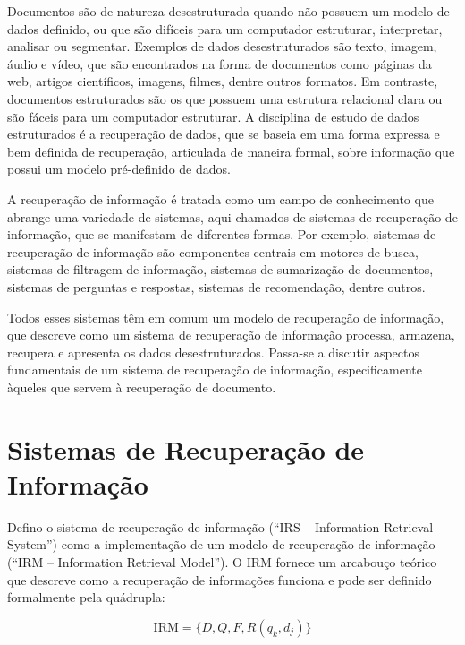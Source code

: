 \documentclass[
	12pt,				%
	openright,			%
	oneside,			%
	a4paper,			%
	english,			%
	french,				%
	spanish,			%
	brazil				%
	]{abntex2}
\begin{document}
Documentos são de natureza desestruturada quando não possuem um modelo de dados definido, ou que são difíceis para um computador
estruturar, interpretar, analisar ou segmentar. \cite{manning2008introduction}
Exemplos de dados desestruturados são texto, imagem, áudio e vídeo, que são encontrados na forma de
documentos como páginas da web, artigos científicos, imagens, filmes, dentre outros formatos.
Em contraste, documentos estruturados são os que possuem uma estrutura relacional clara ou são fáceis para um computador estruturar.
A disciplina de estudo de dados estruturados é a recuperação de dados, que se baseia em uma forma expressa e bem
definida de recuperação, articulada de maneira formal, sobre informação que possui um modelo pré-definido de dados. \cite{JurafskyMartin2023}

A recuperação de informação é tratada como um campo de conhecimento que abrange uma variedade de
sistemas, aqui chamados de sistemas de recuperação de informação, que se manifestam de diferentes formas.
Por exemplo, sistemas de recuperação de informação são componentes centrais em motores de busca,
sistemas de filtragem de informação, sistemas de sumarização de documentos, sistemas de perguntas e respostas,
sistemas de recomendação, dentre outros. \cite{Ceri2013}

Todos esses sistemas têm em comum um modelo de recuperação de informação, que descreve como um sistema de recuperação de informação
processa, armazena, recupera e apresenta os dados desestruturados.
Passa-se a discutir aspectos fundamentais de um sistema de recuperação de informação, especificamente àqueles que
servem à recuperação de documento.

\section{Sistemas de Recuperação de Informação}\label{sec:sistemas-de-recuperacao-de-informacao}

Defino o sistema de recuperação de informação (``IRS -- Information Retrieval System'') como a implementação de um modelo de recuperação de informação (``IRM -- Information Retrieval Model'').
O IRM fornece um arcabouço teórico que descreve como a recuperação de informações funciona e pode ser definido formalmente pela quádrupla: \cite{Ceri2013}

\begin{equation}
\text{IRM} = \{D, Q, F, R(q_k, d_j)\}
\label{eq:irm}
\end{equation}
\end{document}
